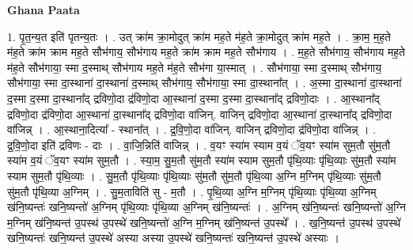 \documentclass[17pt]{extarticle}
\begin{document}
\textbf{Ghana Paata } \newline

1. पृ॒त॒न्य॒त इति॑ पृतन्य॒तः । . उत् क्रा॑म क्रा॒मोदुत् क्रा॑म मह॒ते म॑ह॒ते क्रा॒मोदुत् क्रा॑म मह॒ते । . क्रा॒म॒ म॒ह॒ते म॑ह॒ते क्रा॑म क्राम मह॒ते सौभ॑गाय॒ सौभ॑गाय मह॒ते क्रा॑म क्राम मह॒ते सौभ॑गाय । . म॒ह॒ते सौभ॑गाय॒ सौभ॑गाय मह॒ते म॑ह॒ते सौभ॑गाया॒ स्मा द॒स्माथ् सौभ॑गाय मह॒ते म॑ह॒ते सौभ॑गा या॒स्मात् । . सौभ॑गाया॒ स्मा द॒स्माथ् सौभ॑गाय॒ सौभ॑गाया॒ स्मा दा॒स्थाना॑ दा॒स्थाना॑ द॒स्माथ् सौभ॑गाय॒ सौभ॑गाया॒ स्मा दा॒स्थाना᳚त् । . अ॒स्मा दा॒स्थाना॑ दा॒स्थाना॑ द॒स्मा द॒स्मा दा॒स्थाना᳚द् द्रविणो॒दा द्र॑विणो॒दा आ॒स्थाना॑ द॒स्मा द॒स्मा दा॒स्थाना᳚द् द्रविणो॒दाः । . आ॒स्थाना᳚द् द्रविणो॒दा द्र॑विणो॒दा आ॒स्थाना॑ दा॒स्थाना᳚द् द्रविणो॒दा वा॑जिन्. वाजिन् द्रविणो॒दा आ॒स्थाना॑ दा॒स्थाना᳚द् द्रविणो॒दा वा॑जिन्न् । . आ॒स्थाना॒दित्या᳚ - स्थाना᳚त् । . द्र॒वि॒णो॒दा वा॑जिन्. वाजिन् द्रविणो॒दा द्र॑विणो॒दा वा॑जिन्न् । . द्र॒वि॒णो॒दा इति॑ द्रविणः - दाः । . वा॒जि॒न्निति॑ वाजिन्न् । . व॒यꣳ स्या॑म स्याम व॒यं ॅव॒यꣳ स्या॑म सुम॒तौ सु॑म॒तौ स्या॑म व॒यं ॅव॒यꣳ स्या॑म सुम॒तौ । . स्या॒म॒ सु॒म॒तौ सु॑म॒तौ स्या॑म स्याम सुम॒तौ पृ॑थि॒व्याः पृ॑थि॒व्याः सु॑म॒तौ स्या॑म स्याम सुम॒तौ पृ॑थि॒व्याः । . सु॒म॒तौ पृ॑थि॒व्याः पृ॑थि॒व्याः सु॑म॒तौ सु॑म॒तौ पृ॑थि॒व्या अ॒ग्नि म॒ग्निम् पृ॑थि॒व्याः सु॑म॒तौ सु॑म॒तौ पृ॑थि॒व्या अ॒ग्निम् । . सु॒म॒ताविति॑ सु - म॒तौ । . पृ॒थि॒व्या अ॒ग्नि म॒ग्निम् पृ॑थि॒व्याः पृ॑थि॒व्या अ॒ग्निम् ख॑नि॒ष्यन्तः॑ खनि॒ष्यन्तो॑ अ॒ग्निम् पृ॑थि॒व्याः पृ॑थि॒व्या अ॒ग्निम् ख॑नि॒ष्यन्तः॑ । . अ॒ग्निम् ख॑नि॒ष्यन्तः॑ खनि॒ष्यन्तो॑ अ॒ग्नि म॒ग्निम् ख॑नि॒ष्यन्त॑ उ॒पस्थ॑ उ॒पस्थे॑ खनि॒ष्यन्तो॑ अ॒ग्नि म॒ग्निम् ख॑नि॒ष्यन्त॑ उ॒पस्थे᳚ । . ख॒नि॒ष्यन्त॑ उ॒पस्थ॑ उ॒पस्थे॑ खनि॒ष्यन्तः॑ खनि॒ष्यन्त॑ उ॒पस्थे॑ अस्या अस्या उ॒पस्थे॑ खनि॒ष्यन्तः॑ खनि॒ष्यन्त॑ उ॒पस्थे॑ अस्याः । \newline
\end{document}
